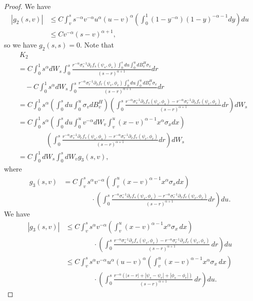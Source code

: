 \documentclass{article}
\theoremstyle{definition}  %
\theoremstyle{plain}  %
\begin{document}
\begin{proof}
    We have
    \begin{align*}
        |g_2(s,v)|&\leq C \int_v^s s^{-\alpha} v^{-\alpha}  u^\alpha (u-v)^\alpha \left( \int_0^1 (1-y^{-\alpha})(1-y)^{-\alpha-1} dy\right)  du\\
        &\leq C   v^{-\alpha}(s-v)^{\alpha+1},
    \end{align*}
    so we have $g_2(s,s)=0.$ Note that
      \begin{align*}
        &\ K_2\\
        &=C\int_0^1 s^\alpha dW_s \int_0^s \frac{r^{-\alpha}\sigma_s^{-1}\partial_x f_s(\psi_s,\phi_s)\int_0^s du\int_0^u dB^H_v \sigma_v}{(s-r)^{\alpha+1}}dr\\
        &\quad-C\int_0^1 s^\alpha dW_s \int_0^s \frac{r^{-\alpha}\sigma_r^{-1}\partial_x f_r(\psi_r,\phi_r)\int_0^s du\int_0^u dB^H_v \sigma_v }{(s-r)^{\alpha+1}}dr\\
        &= C\int_0^1 s^\alpha  \left( \int_0^sdu \int_0^u \sigma_v dB^H_v\right) \left(\int_0^s  \frac{r^{-\alpha}\sigma_s^{-1}\partial_x f_s(\psi_s,\phi_s)-r^{-\alpha}\sigma_r^{-1}\partial_x f_r(\psi_r,\phi_r)}{(s-r)^{\alpha+1}} dr\right)dW_s   \\
        &=C \int_0^1 s^\alpha \left(\int_0^sdu \int_0^u v^{-\alpha}dW_v\int_v^u (x-v)^{\alpha-1}x^\alpha \sigma_x dx    \right)\\
        &\qquad\qquad\left(\int_0^s  \frac{r^{-\alpha}\sigma_s^{-1}\partial_x f_s(\psi_s,\phi_s)-r^{-\alpha}\sigma_r^{-1}\partial_x f_r(\psi_r,\phi_r)}{(s-r)^{\alpha+1}} dr\right)dW_s \\
        &=C\int_0^1 dW_s \int_0^s dW_v g_3(s,v),
    \end{align*}
where
\begin{align*}
    g_3(s,v)&=C\int_v^s      s^\alpha  v^{-\alpha}   \left( \int_v^u (x-v)^{\alpha-1}x^\alpha \sigma_x dx \right)\\
    &\qquad\qquad\cdot\left(\int_0^s  \frac{r^{-\alpha}\sigma_s^{-1}\partial_x f_s(\psi_s,\phi_s)-r^{-\alpha}\sigma_r^{-1}\partial_x f_r(\psi_r,\phi_r)}{(s-r)^{\alpha+1}} dr\right)du.
\end{align*}
   We have
\begin{align*}
    |g_3(s,v)| &\leq C \int_v^s s^\alpha v^{-\alpha} \left( \int_v^u (x-v)^{\alpha-1} x^\alpha \sigma_x \, dx \right) \\
    &\qquad\qquad \cdot \left( \int_0^s \frac{r^{-\alpha} \sigma_s^{-1} \partial_x f_s(\psi_s, \phi_s) - r^{-\alpha} \sigma_r^{-1} \partial_x f_r(\psi_r, \phi_r)}{(s - r)^{\alpha + 1}} \, dr \right) du \\
    &\leq C \int_v^s s^\alpha v^{-\alpha} u^\alpha (u - v)^\alpha \left( \int_v^u (x - v)^{\alpha - 1} x^\alpha \sigma_x \, dx \right) \\
    &\qquad\qquad \cdot \left( \int_0^s \frac{r^{-\alpha} (|s - r| + |\psi_s - \psi_r| + |\phi_s - \phi_r|)}{(s - r)^{\alpha + 1}} \, dr \right) du.
\end{align*}


\end{proof}
\end{document}
